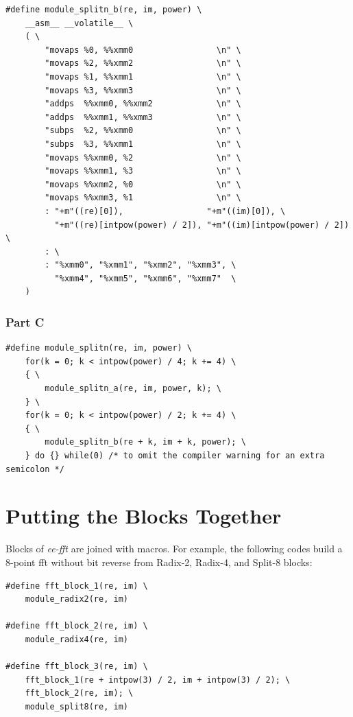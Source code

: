 \documentclass[a4paper]{report}
\begin{document}
    \lstset{language = c, tabsize = 4}
    \begin{lstlisting}
#define module_splitn_b(re, im, power) \
    __asm__ __volatile__ \
    ( \
        "movaps %0, %%xmm0                 \n" \
        "movaps %2, %%xmm2                 \n" \
        "movaps %1, %%xmm1                 \n" \
        "movaps %3, %%xmm3                 \n" \
        "addps  %%xmm0, %%xmm2             \n" \
        "addps  %%xmm1, %%xmm3             \n" \
        "subps  %2, %%xmm0                 \n" \
        "subps  %3, %%xmm1                 \n" \
        "movaps %%xmm0, %2                 \n" \
        "movaps %%xmm1, %3                 \n" \
        "movaps %%xmm2, %0                 \n" \
        "movaps %%xmm3, %1                 \n" \
        : "+m"((re)[0]),                 "+m"((im)[0]), \
          "+m"((re)[intpow(power) / 2]), "+m"((im)[intpow(power) / 2]) \
        : \
        : "%xmm0", "%xmm1", "%xmm2", "%xmm3", \
          "%xmm4", "%xmm5", "%xmm6", "%xmm7"  \
    )
    \end{lstlisting}

\subsubsection{Part C} \indent

    \lstset{language = c, tabsize = 4}
    \begin{lstlisting}
#define module_splitn(re, im, power) \
    for(k = 0; k < intpow(power) / 4; k += 4) \
    { \
        module_splitn_a(re, im, power, k); \
    } \
    for(k = 0; k < intpow(power) / 2; k += 4) \
    { \
        module_splitn_b(re + k, im + k, power); \
    } do {} while(0) /* to omit the compiler warning for an extra semicolon */
    \end{lstlisting}
    
\section{Putting the Blocks Together} \indent

	Blocks of \textit{ee-fft} are joined with macros. For example, the following codes build a 8-point fft without bit reverse from Radix-2, Radix-4, and Split-8 blocks:

    \lstset{language = c, tabsize = 4}
    \begin{lstlisting}
#define fft_block_1(re, im) \
    module_radix2(re, im)

#define fft_block_2(re, im) \
    module_radix4(re, im)

#define fft_block_3(re, im) \
    fft_block_1(re + intpow(3) / 2, im + intpow(3) / 2); \
    fft_block_2(re, im); \
    module_split8(re, im)
    \end{lstlisting}
\end{document}
